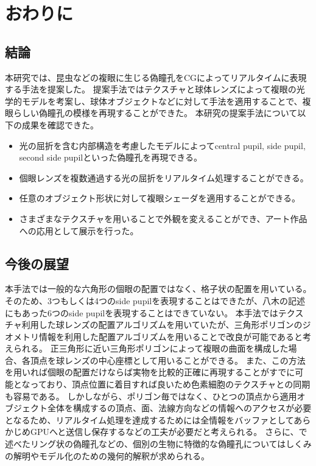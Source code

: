 \chapter{おわりに}
\label{CConclusion}

\section{結論}
\label{SConclusion}

本研究では、昆虫などの複眼に生じる偽瞳孔をCGによってリアルタイムに表現する手法を提案した。
提案手法ではテクスチャと球体レンズによって複眼の光学的モデルを考案し、球体オブジェクトなどに対して手法を適用することで、複眼らしい偽瞳孔の模様を再現することができた。
本研究の提案手法について以下の成果を確認できた。

\begin{itemize}
\item 光の屈折を含む内部構造を考慮したモデルによってcentral pupil, side pupil, second side pupilといった偽瞳孔を再現できる。
\item 個眼レンズを複数通過する光の屈折をリアルタイム処理することができる。
\item 任意のオブジェクト形状に対して複眼シェーダを適用することができる。
\item さまざまなテクスチャを用いることで外観を変えることができ、アート作品への応用として展示を行った。
\end{itemize}

\section{今後の展望}
\label{SFutureWork}

本手法では一般的な六角形の個眼の配置ではなく、格子状の配置を用いている。
そのため、3つもしくは4つのside pupilを表現することはできたが、八木\cite{yagi1951studies}の記述にもあった6つのside pupilを表現することはできていない。
本手法ではテクスチャ利用した球レンズの配置アルゴリズムを用いていたが、三角形ポリゴンのジオメトリ情報を利用した配置アルゴリズムを用いることで改良が可能であると考えられる。
正三角形に近い三角形ポリゴンによって複眼の曲面を構成した場合、各頂点を球レンズの中心座標として用いることができる。
また、この方法を用いれば個眼の配置だけならば実物を比較的正確に再現することがすでに可能となっており\cite{making-of-upside-down}、頂点位置に着目すれば良いため色素細胞のテクスチャとの同期も容易である。
しかしながら、ポリゴン毎ではなく、ひとつの頂点から適用オブジェクト全体を構成するの頂点、面、法線方向などの情報へのアクセスが必要となるため、リアルタイム処理を達成するためには全情報をバッファとしてあらかじめGPUへと送信し保存するなどの工夫が必要だと考えられる。
さらに、で述べたリング状の偽瞳孔などの、個別の生物に特徴的な偽瞳孔についてはしくみの解明やモデル化のための幾何的解釈が求められる。


